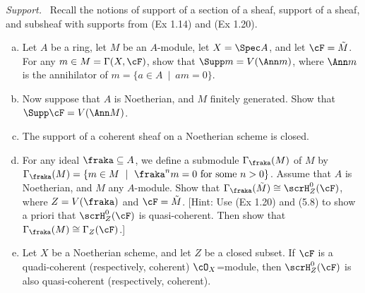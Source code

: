 \newpage
{}
\begin{homework}[e]
	 \emph{Support.}~ Recall the notions of support of a section of a sheaf, support of a sheaf, and subsheaf with supports from (Ex 1.14) and (Ex 1.20).
	\begin{enumerate}[(a)]
		\item Let $A$ be a ring, let $M$ be an $A$-module, let $X = \Spec A$, and let $\cF = \tilde{M}$. For any $m \in M = \Gamma(X,\cF)$, show that $\Supp m = V(\Ann m)$, where $\Ann m$ is the annihilator of $m = \{ a \in A ~\mid~ am = 0\}$.
		\item Now suppose that $A$ is Noetherian, and $M$ finitely generated. Show that $\Supp \cF = V(\Ann M)$.
		\item The support of a coherent sheaf on a Noetherian scheme is closed.
		\item For any ideal $\fraka \subseteq A$, we define a submodule $\Gamma_\fraka(M)$ of $M$ by $\Gamma_\fraka(M) = \{m \in M~\mid~\fraka^nm = 0 \text{ for some } n >0\}$. Assume that $A$ is Noetherian, and $M$ any $A$-module. Show that $\Gamma_\fraka(\tilde{M}) \cong \scrH^0_Z(\cF)$, where $Z = V(\fraka)$ and $\cF = \tilde{M}$. [Hint: Use (Ex 1.20) and (5.8) to show a priori that $\scrH^0_Z(\cF)$ is quasi-coherent. Then show that $\Gamma_\fraka(M) \cong \Gamma_Z(\cF)$.]
		\item Let $X$ be a Noetherian scheme, and let $Z$ be a closed subset. If $\cF$ is a quadi-coherent (respectively, coherent) $\cO_X$=module, then $\scrH^0_Z(\cF)$ is also quasi-coherent (respectively, coherent).
	\end{enumerate}
	
\end{homework}
\newpage
{}

